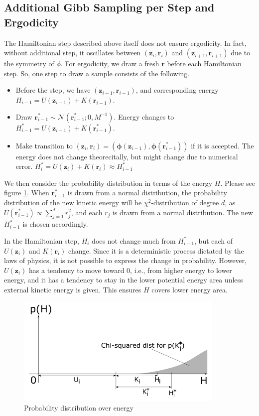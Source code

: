 \documentclass[a4]{article}
\begin{document}
\subsection{Additional Gibb Sampling per Step and Ergodicity}
The Hamiltonian step described above itself does not ensure ergodicity.
In fact, without additional step, it oscillates between 
$( \bm{z}_{i}, \bm{r}_{i} )$ and $(\bm{z}_{i+1}, \bm{r}_{i+1})$ due
to the symmetry of $\phi$. For ergodicity, we draw a fresh $\bm{r}$
before each Hamiltonian step. So, one step to draw a sample consists of
the following.
\begin{itemize}
\item Before the step, we have $( \bm{z}_{i-1}, \bm{r}_{i-1} )$, and 
corresponding energy $H_{i-1} = U(\bm{z}_{i-1}) + K(\bm{r}_{i-1} )$.
\item Draw
$\bm{r}^*_{i-1} \sim \mathcal{N}\left( \bm{r}^*_{i-1};0, M^{-1}\right)$.
Energy changes to $H^*_{i-1} = U(\bm{z}_{i-1}) + K(\bm{r}^*_{i-1} )$.
\item Make transition to
$(\bm{z}_{i}, \bm{r}_{i}) = 
\left( \bm{\phi}(\bm{z}_{i-1}), \bm{\phi}(\bm{r}^*_{i-1}) \right)$ if
it is accepted. The energy does not change theorecitally, but might change
due to numerical error.
$H^*_{i} = U(\bm{z}_{i}) + K(\bm{r}_{i} ) \approx H^*_{i-1}$
\end{itemize}

We then consider the probability distribution in terms of the energy $H$.
Please see figure \ref{fig:hmcmc_energy}.
When $\bm{r}^*_{i-1}$ is drawn from a normal distribution, the probability
distribution of the new kinetic energy will be $\chi^2$-distribution of
degree $d$, as $U(\bm{r}^*_{i-1}) \propto \sum_{j=1}^d r^2_j$, and each
$r_j$ is drawn from a normal distribution.
The new $H^*_{i-1}$ is chosen accordingly.

In the Hamiltonian step, $H_i$ does not change much from $H^*_{i-1}$, but
each of $U(\bm{z}_{i})$ and $K(\bm{r}_{i} )$ change.
Since it is a deterministic process dictated by the laws of physics, it is
not possible to express the change in probability.
However, $U(\bm{z}_{i})$ has a tendency to move toward 0, i.e., from higher
energy to lower energy, and it has a tendency to stay in the lower potential
energy area unless external kinetic energy is given. This ensures $H$ covers
lower energy area.

\begin{figure}
\centering
\includegraphics[width=10cm]{hmcmc_kinetic_energy_distribution.png}
\caption{Probability distribution over energy}
\label{fig:hmcmc_energy}
\end{figure}



{}

\end{document}
